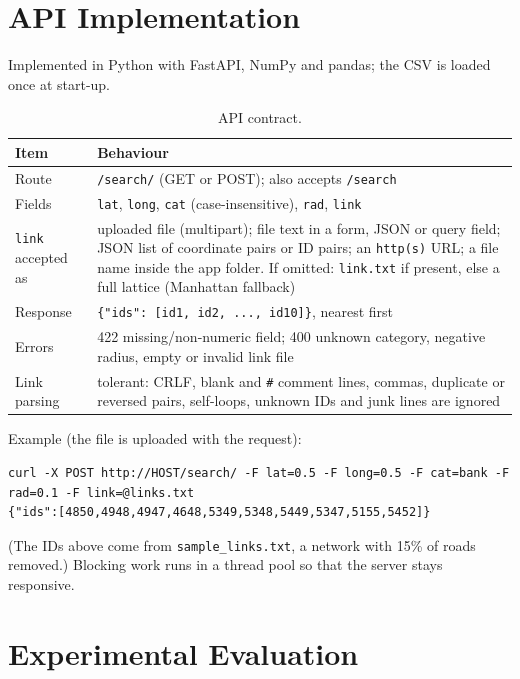 \documentclass[11pt,a4paper]{article}
\newcommand{\code}[1]{\texttt{#1}}
\begin{document}
\section{API Implementation}
Implemented in Python with FastAPI, NumPy and pandas; the CSV is loaded once at start-up.

\begin{table}[h]\centering\small
\begin{tabular}{@{}p{3.6cm}p{11.2cm}@{}}\toprule
\textbf{Item} & \textbf{Behaviour}\\\midrule
Route & \code{/search/} (GET or POST); also accepts \code{/search}\\
Fields & \code{lat}, \code{long}, \code{cat} (case-insensitive), \code{rad}, \code{link}\\
\code{link} accepted as & uploaded file (multipart); file text in a form, JSON or query field; JSON list of coordinate pairs or ID pairs; an \code{http(s)} URL; a file name inside the app folder. If omitted: \code{link.txt} if present, else a full lattice (Manhattan fallback)\\
Response & \code{\{"ids": [id1, id2, ..., id10]\}}, nearest first\\
Errors & 422 missing/non-numeric field; 400 unknown category, negative radius, empty or invalid link file\\
Link parsing & tolerant: CRLF, blank and \code{\#} comment lines, commas, duplicate or reversed pairs, self-loops, unknown IDs and junk lines are ignored\\\bottomrule
\end{tabular}
\caption{API contract.}
\end{table}
Example (the file is uploaded with the request):
\begin{lstlisting}
curl -X POST http://HOST/search/ -F lat=0.5 -F long=0.5 -F cat=bank -F rad=0.1 -F link=@links.txt
{"ids":[4850,4948,4947,4648,5349,5348,5449,5347,5155,5452]}
\end{lstlisting}
(The IDs above come from \code{sample\_links.txt}, a network with 15\% of roads removed.) Blocking work runs in a thread pool so
that the server stays responsive.

\section{Experimental Evaluation}
\end{document}
